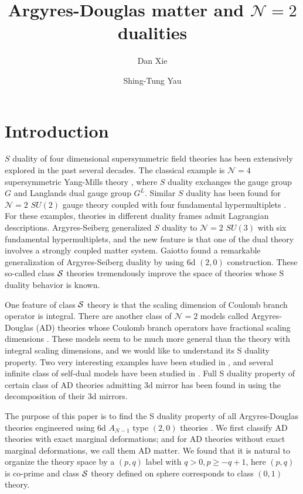 \documentclass[a4paper,11pt]{article}
\title{Argyres-Douglas matter and  $\mathcal{N}=2$ dualities}
\author[b,c]{Dan Xie}
\author[a,b,c]{Shing-Tung Yau}
\affiliation[a]{Department of Mathematics, Harvard University, Cambridge, MA 02138, USA}
\affiliation[b]{Center of Mathematical Sciences and Applications, Harvard University, Cambridge, 02138, USA}
\affiliation[c]{Jefferson Physical Laboratory, Harvard University, Cambridge, MA 02138, USA}
\begin{document}
 
\maketitle
\flushbottom


\section{Introduction}
$S$ duality of four dimensional supersymmetric field theories has been extensively explored in the past several decades. 
The classical example is $\mathcal{N}=4$ supersymmetric Yang-Mills theory \cite{Montonen:1977sn}, where $S$ duality exchanges the gauge group $G$ 
and Langlands dual gauge group $G^{L}$. Similar $S$ duality has been found for $\mathcal{N}=2$ $SU(2)$ gauge theory coupled with four fundamental 
hypermultiplets \cite{Seiberg:1994aj}. For these examples, theories in different duality frames admit Lagrangian descriptions. 
Argyres-Seiberg \cite{Argyres:2007cn} generalized $S$ duality to $\mathcal{N}=2$ $SU(3)$ with six fundamental 
hypermultiplets, and the new feature is that one of the dual theory involves a strongly coupled matter system. 
Gaiotto \cite{Gaiotto:2009we} found a remarkable generalization  of Argyres-Seiberg duality by using 
6d $(2,0)$ construction. These so-called class  ${\cal S}$ theories tremendously improve the space of theories whose S duality behavior is known. 

One feature of class ${\cal S}$ theory is that the scaling dimension of Coulomb branch operator is integral. 
There are another class of $\mathcal{N}=2$ models called Argyres-Douglas (AD) theories whose Coulomb branch operators
have fractional scaling dimensions \cite{Argyres:1995jj,Argyres:1995xn}. These models seem to be much more general than the theory with integral scaling dimensions, 
and we would like to understand its S duality property. Two very interesting examples have been studied in \cite{Buican:2014hfa}, and 
several infinite class of self-dual models have been studied in \cite{DelZotto:2015rca}. Full S duality property of certain class of AD theories 
admitting 3d mirror has been found in \cite{Xie:2016uqq} using the decomposition of their 3d mirrors. 

The purpose of this paper is to find the S duality property of  all Argyres-Douglas  theories  engineered using 
6d $A_{N-1}$ type $(2,0)$  theories \cite{Xie:2012hs}. We first classify  AD theories with exact marginal deformations; and for AD theories without exact marginal deformations, we call them AD matter.  We found that it is natural to organize the theory space by a  $(p,q)$ label with $q>0, p\geq -q+1$, here $(p,q)$ is co-prime and class ${\cal S}$ theory defined on sphere  corresponds to class $(0,1)$ theory. 
\end{document}

